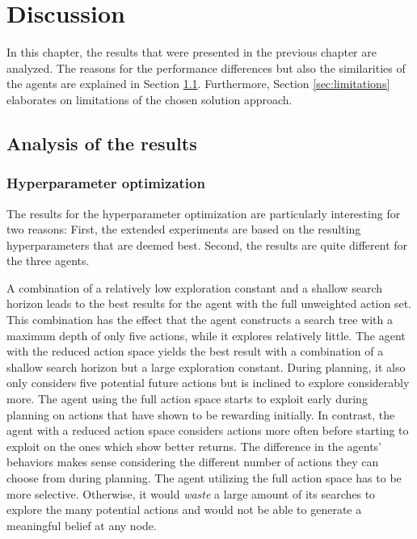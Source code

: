 \chapter{Discussion}
\label{sec:discussion}

In this chapter, the results that were presented in the previous chapter are analyzed. The reasons for the performance differences but also the similarities of the agents are explained in Section \ref{sec:discussion_analysis}. Furthermore, Section \ref{sec:limitations} elaborates on limitations of the chosen solution approach.

\section{Analysis of the results}
\label{sec:discussion_analysis}

\subsection{Hyperparameter optimization}

The results for the hyperparameter optimization are particularly interesting for two reasons: First, the extended experiments are based on the resulting hyperparameters that are deemed best. Second, the results are quite different for the three agents. 

A combination of a relatively low exploration constant and a shallow search horizon leads to the best results for the agent with the full unweighted action set. This combination has the effect that the agent constructs a search tree with a maximum depth of only five actions, while it explores relatively little. The agent with the reduced action space yields the best result with a combination of a shallow search horizon but a large exploration constant. During planning, it also only considers five potential future actions but is inclined to explore considerably more. The agent using the full action space starts to exploit early during planning on actions that have shown to be rewarding initially. In contrast, the agent with a reduced action space considers actions more often before starting to exploit on the ones which show better returns. The difference in the agents' behaviors makes sense considering the different number of actions they can choose from during planning. The agent utilizing the full action space has to be more selective. Otherwise, it would \emph{waste} a large amount of its searches to explore the many potential actions and would not be able to generate a meaningful belief at any node.

